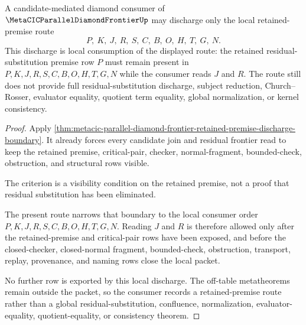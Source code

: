 \begin{theorem}
\label{thm:metacic-parallel-diamond-retained-premise-discharge-route}
A candidate-mediated diamond consumer of $\MetaCICParallelDiamondFrontierUp$ may discharge only the local retained-premise route
$$
P,\ K,\ J,\ R,\ S,\ C,\ B,\ O,\ H,\ T,\ G,\ N .
$$
This discharge is local consumption of the displayed route: the retained residual-substitution premise row $P$ must remain present in $P,K,J,R,S,C,B,O,H,T,G,N$ while the consumer reads $J$ and $R$.
The route still does not provide full residual-substitution discharge, subject reduction, Church--Rosser, evaluator equality, quotient term equality, global normalization, or kernel consistency.
\end{theorem}
\begin{proof}
Apply \autoref{thm:metacic-parallel-diamond-frontier-retained-premise-discharge-boundary}. It already forces every candidate join and residual frontier read to keep the retained premise, critical-pair, checker, normal-fragment, bounded-check, obstruction, and structural rows visible.

The criterion is a visibility condition on the retained premise, not a proof that residual substitution has been eliminated.

The present route narrows that boundary to the local consumer order $P,K,J,R,S,C,B,O,H,T,G,N$. Reading $J$ and $R$ is therefore allowed only after the retained-premise and critical-pair rows have been exposed, and before the closed-checker, closed-normal fragment, bounded-check, obstruction, transport, replay, provenance, and naming rows close the local packet.

No further row is exported by this local discharge. The off-table metatheorems remain outside the packet, so the consumer records a retained-premise route rather than a global residual-substitution, confluence, normalization, evaluator-equality, quotient-equality, or consistency theorem.
\end{proof}

